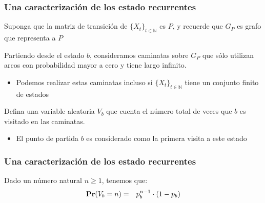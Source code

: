 \begin{frame}
\frametitle{Una caracterización de los estado recurrentes}
{\footnotesize

Suponga que la matriz de transición de $\{ X_t \}_{t \in \mathbb{N}}$ es $P$, y recuerde que $G_P$ es grafo que representa a $P$


Partiendo desde el estado $b$, consideramos caminatas sobre $G_P$ que sólo utilizan arcos con probabilidad mayor a cero y tiene largo infinito.
\begin{itemize}
\item Podemos realizar estas caminatas incluso si $\{ X_t \}_{t \in \mathbb{N}}$ tiene un conjunto finito de estados
\end{itemize}


Defina una variable aleatoria $V_b$ que cuenta el número total de veces que $b$ es visitado en las caminatas.
\begin{itemize}
\item El punto de partida $b$ es considerado como la primera visita a este estado
\end{itemize}
}

\end{frame}

\begin{frame}
\frametitle{Una caracterización de los estado recurrentes}
{\footnotesize

Dado un número natural $n \geq 1$, tenemos que:
\alert{
\begin{eqnarray*}
{\rm {\bf Pr}}(V_b = n) & = & p_b^{n-1} \cdot (1 - p_b)
\end{eqnarray*}}







}

\end{frame}


